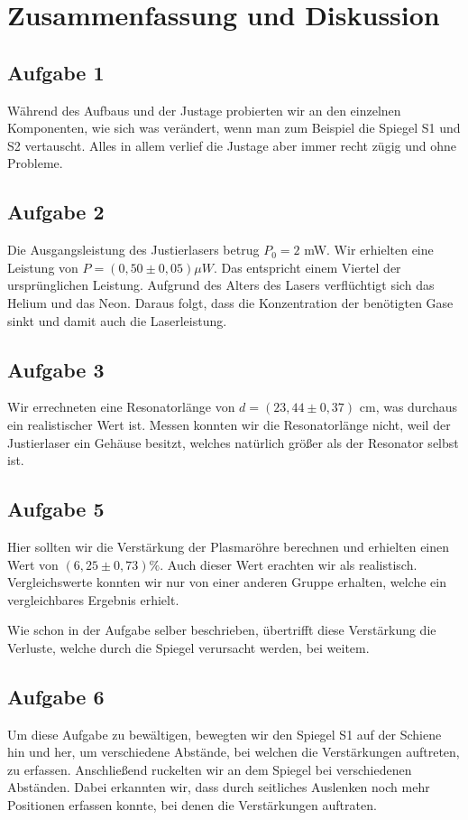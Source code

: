 \section{Zusammenfassung und Diskussion}

\subsection{Aufgabe 1}
Während des Aufbaus und der Justage probierten wir an den einzelnen Komponenten, wie sich was verändert, wenn man zum Beispiel die Spiegel S1 und S2 vertauscht. Alles in allem verlief die Justage aber immer recht zügig und ohne Probleme.

\subsection{Aufgabe 2}
Die Ausgangsleistung des Justierlasers betrug $P_0 = 2$ mW. Wir erhielten eine Leistung von $P = (0,50 \pm 0,05)\mu W$. Das entspricht einem Viertel der ursprünglichen Leistung. Aufgrund des Alters des Lasers verflüchtigt sich das Helium und das Neon. Daraus folgt, dass die Konzentration der benötigten Gase sinkt und damit auch die Laserleistung.

\subsection{Aufgabe 3}
Wir errechneten eine Resonatorlänge von $d = (23,44 \pm 0,37)$ cm, was durchaus ein realistischer Wert ist. Messen konnten wir die Resonatorlänge nicht, weil der Justierlaser ein Gehäuse besitzt, welches natürlich größer als der Resonator selbst ist.

\subsection{Aufgabe 5}
Hier sollten wir die Verstärkung der Plasmaröhre berechnen und erhielten einen Wert von $(6,25 \pm 0,73)\%$. Auch dieser Wert erachten wir als realistisch. Vergleichswerte konnten wir nur von einer anderen Gruppe erhalten, welche ein vergleichbares Ergebnis erhielt.

Wie schon in der Aufgabe selber beschrieben, übertrifft diese Verstärkung die Verluste, welche durch die Spiegel verursacht werden, bei weitem.

\subsection{Aufgabe 6}
Um diese Aufgabe zu bewältigen, bewegten wir den Spiegel S1 auf der Schiene hin und her, um verschiedene Abstände, bei welchen die Verstärkungen auftreten, zu erfassen. Anschließend ruckelten wir an dem Spiegel bei verschiedenen Abständen. Dabei erkannten wir, dass durch seitliches Auslenken noch mehr Positionen erfassen konnte, bei denen die Verstärkungen auftraten.

